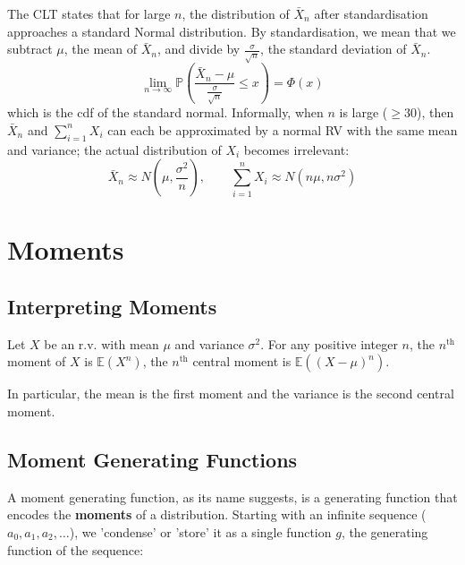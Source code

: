 \documentclass{article}
\begin{document}
\begin{definition}
    The CLT states that for large $n$, the distribution of $\bar{X}_n$ after standardisation approaches a standard Normal distribution. By standardisation, we mean that we subtract $\mu$, the mean of $\bar{X}_n$, and divide by $\frac{\sigma}{\sqrt{n}}$, the standard deviation of $\bar{X}_n$. 
    \begin{equation}
        \lim_{n \to \infty} \mathbb{P}(\frac{\bar{X}_n - \mu}{\frac{\sigma}{\sqrt{n}}} \leq x) = \Phi(x)    
    \end{equation}
    \noindent which is the cdf of the standard normal. Informally, when $n$ is large ($\geq 30$), then $\bar{X}_n$ and $\sum_{i=1}^{n} X_i$ can each be approximated by a normal RV with the same mean and variance; the actual distribution of $X_i$ becomes irrelevant:
    \begin{equation*}
        \bar{X}_n \approx N(\mu, \frac{\sigma^{2}}{n}), \qquad \sum_{i=1}^{n} X_i \approx N(n\mu, n\sigma^{2})
    \end{equation*}
\end{definition}

\section{Moments}

\subsection{Interpreting Moments}
\begin{definition}
    Let $X$ be an r.v. with mean $\mu$ and variance $\sigma^{2}$. For any positive integer $n$, the $n^{\text{th}}$ moment of $X$ is $\mathbb{E}(X^{n})$, the $n^{\text{th}}$ central moment is $\mathbb{E}((X - \mu)^{n})$. 
\end{definition}

\noindent In particular, the mean is the first moment and the variance is the second central moment. 

\subsection{Moment Generating Functions}
A moment generating function, as its name suggests, is a generating function that encodes the \textbf{moments} of a distribution. Starting with an infinite sequence ($a_{0}, a_{1}, a_{2}, \dots$), we 'condense' or 'store' it as a single function $g$, the generating function of the sequence:
\end{document}
